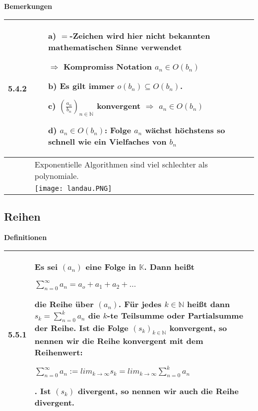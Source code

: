     \noindent
    \textbf{Bemerkungen}
    \begin{table}[H]
    \begin{tabularx}{\textwidth}{X m{16cm}}
        \toprule

        5.4.2 & \begin{itemize}[topsep=-0.5cm]
                    \item[a)] $=$-Zeichen wird hier nicht bekannten mathematischen Sinne verwendet
                    \item[] $\Rightarrow$ Kompromiss Notation $a_n \in O(b_n)$ 
                    \item[b)] Es gilt immer $o(b_n) \subseteq O(b_n)$. 
                    \item[c)] $(\frac{a_n}{b_n})_{n \in \mathbb{N}}$ konvergent $\Rightarrow$ $a_n \in O(b_n)$
                    \item[d)] $a_n \in O(b_n)$: Folge $a_n$ wächst höchstens so schnell wie ein Vielfaches von $b_n$  
                \end{itemize} \vspace{-0cm} \\
        \midrule
            & Exponentielle Algorithmen sind viel schlechter als polynomiale. \\
        \midrule
            & \texttt{[image: landau.PNG]} \\

        \bottomrule
    \end{tabularx}
    \end{table}

\pagebreak

\subsection{Reihen}
    \noindent
    \textbf{Definitionen}
    \begin{table}[H]  
    \begin{tabularx}{\textwidth}{X m{16cm}}
        \toprule

        5.5.1 & Es sei $(a_n)$ eine Folge in $\mathbb{K}$. Dann heißt \hfill \break
                \centerline{$\sum^{\infty}_{n=0} a_n = a_o + a_1 + a_2 + ... $}
                die \textbf{Reihe} über $(a_n)$. \hfill \break
                Für jedes $k \in \mathbb{N}$ heißt dann $s_k = \sum^{k}_{n=0} a_n$ die $k$-te Teilsumme oder \textbf{Partialsumme} der Reihe. \hfill \break
                Ist die Folge $(s_k)_{k \in \mathbb{N}}$ konvergent, so nennen wir die Reihe \textbf{konvergent} mit dem Reihenwert: \hfill \break
                \centerline{$\sum^{\infty}_{n=0} a_n := lim_{k \rightarrow \infty} s_k = lim_{k \rightarrow \infty} \sum^{k}_{n=0} a_n$}.
                Ist $(s_k)$ divergent, so nennen wir auch die Reihe divergent.  \\

        \bottomrule

    \end{tabularx}
    \end{table}

